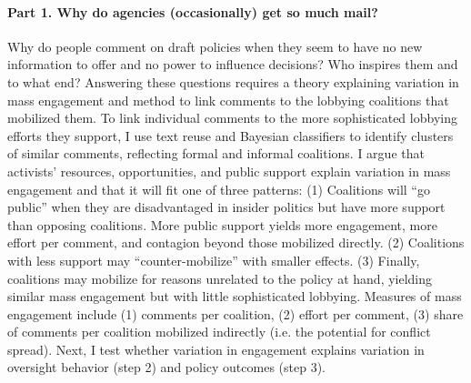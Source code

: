 \paragraph{Part 1. Why do agencies (occasionally) get so much mail?} %
Why do people comment on draft policies when they seem to have no new information to offer and no power to influence decisions? Who inspires them and to what end? 
Answering these questions requires a theory explaining variation in mass engagement and method to link comments to the lobbying coalitions that mobilized them.  
To link individual comments to the more sophisticated lobbying efforts they support, I use text reuse and Bayesian classifiers to identify clusters of similar comments, reflecting formal and informal coalitions.
I argue that activists' resources, opportunities, and public support explain variation in mass engagement %
and that it will fit one of three patterns:
(1) Coalitions will ``go public'' when they are disadvantaged in insider politics but have more support than opposing coalitions. More public support yields more engagement, more effort per comment, and contagion beyond those mobilized directly. (2) Coalitions with less support may ``counter-mobilize'' with smaller effects. (3) Finally, coalitions may mobilize for reasons unrelated to the policy at hand, yielding similar mass engagement but with little sophisticated lobbying. 
Measures of mass engagement include 
(1) comments per coalition, %
(2) effort per comment, %
(3) share of comments per coalition mobilized indirectly (i.e. the potential for conflict spread).
Next, I test whether variation in engagement explains variation in oversight behavior (step 2) and policy outcomes (step 3).

